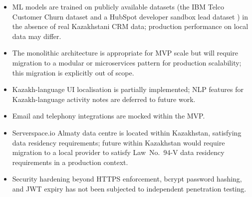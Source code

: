 \begin{itemize}
  \item ML models are trained on publicly available datasets (the IBM Telco
  Customer Churn dataset \citep{ibmtelco} and a HubSpot developer sandbox
  lead dataset \citep{hubspot_leads}) in the absence of real Kazakhstani
  CRM data; production performance on local data may differ.
  \item The monolithic architecture is appropriate for MVP scale but will
  require migration to a modular or microservices pattern for production
  scalability; this migration is explicitly out of scope.
  \item Kazakh-language UI localisation is partially implemented; NLP
  features for Kazakh-language activity notes are deferred to future work.
  \item Email and telephony integrations are mocked within the MVP.
  \item Serverspace.io Almaty data centre is located within Kazakhstan, satisfying data residency requirements; future
  within Kazakhstan would require migration to a local provider to satisfy
  Law~No.~94-V data residency requirements in a production context.
  \item Security hardening beyond HTTPS enforcement, bcrypt password
  hashing, and JWT expiry has not been subjected to independent
  penetration testing.
\end{itemize}


